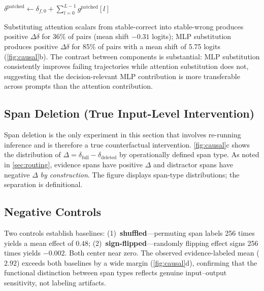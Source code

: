 \documentclass{article}
\begin{document}
\begin{algorithm}[t]
\DontPrintSemicolon
\caption{Simulated Activation Substitution}\label{alg:substitution}
$\delta^{\mathrm{patched}} \leftarrow \delta_{f,0} + \displaystyle\sum_{l=0}^{L-1} g^{\mathrm{patched}}[l]$\;
\;
\end{algorithm}

Substituting attention scalars from stable-correct into stable-wrong produces positive $\Delta\delta$ for 36\% of pairs (mean shift $-0.31$ logits); MLP substitution produces positive $\Delta\delta$ for 85\% of pairs with a mean shift of 5.75 logits (\cref{fig:causal}b).  The contrast between components is substantial: MLP substitution consistently improves failing trajectories while attention substitution does not, suggesting that the decision-relevant MLP contribution is more transferable across prompts than the attention contribution.

\subsection{Span Deletion (True Input-Level Intervention)}

Span deletion is the only experiment in this section that involves re-running inference and is therefore a true counterfactual intervention.  \cref{fig:causal}c shows the distribution of $\Delta = \delta_{\mathrm{full}} - \delta_{\mathrm{deleted}}$ by operationally defined span type.  As noted in \cref{sec:routing}, evidence spans have positive $\Delta$ and distractor spans have negative $\Delta$ \emph{by construction}.  The figure displays span-type distributions; the separation is definitional.

\subsection{Negative Controls}

Two controls establish baselines: (1)~\textbf{shuffled}---permuting span labels 256 times yields a mean effect of $0.48$; (2)~\textbf{sign-flipped}---randomly flipping effect signs 256 times yields $-0.002$.  Both center near zero.  The observed evidence-labeled mean ($2.92$) exceeds both baselines by a wide margin (\cref{fig:causal}d), confirming that the functional distinction between span types reflects genuine input--output sensitivity, not labeling artifacts.
\end{document}
